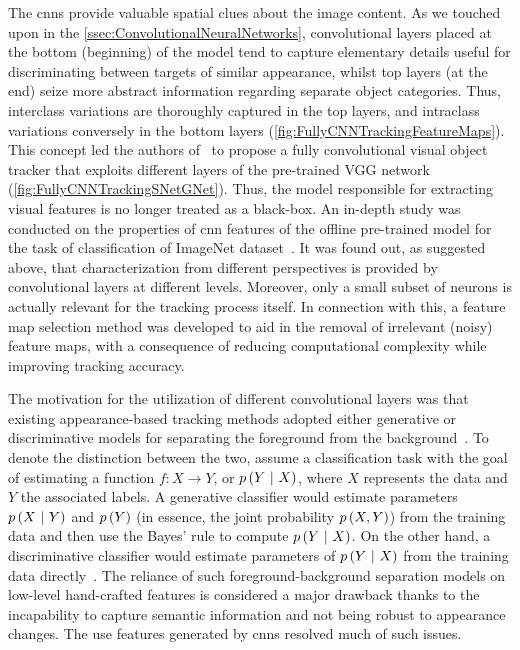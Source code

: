 The \glspl{cnn} provide valuable spatial clues about the image content. As we touched upon in the \cref{ssec:ConvolutionalNeuralNetworks}, convolutional layers placed at the bottom (beginning) of the model tend to capture elementary details useful for discriminating between targets of similar appearance, whilst top layers (at the end) seize more abstract information regarding separate object categories. Thus, interclass variations are thoroughly captured in the top layers, and intraclass variations conversely in the bottom layers (\cref{fig:FullyCNNTrackingFeatureMaps}). This concept led the authors of~\cite{Wang2015} to propose a fully convolutional visual object tracker that exploits different layers of the pre-trained VGG network~\cite{Simonyan2015} (\cref{fig:FullyCNNTrackingSNetGNet}). Thus, the model responsible for extracting visual features is no longer treated as a black-box. An in-depth study was conducted on the properties of \gls{cnn} features of the offline pre-trained model for the task of classification of ImageNet dataset~\cite{JiaDeng2009}. It was found out, as suggested above, that characterization from different perspectives is provided by convolutional layers at different levels. Moreover, only a small subset of neurons is actually relevant for the tracking process itself. In connection with this, a feature map selection method was developed to aid in the removal of irrelevant (noisy) feature maps, with a consequence of reducing computational complexity while improving tracking accuracy.

The motivation for the utilization of different convolutional layers was that existing appearance-based tracking methods adopted either generative or discriminative models for separating the foreground from the background~\cite{Wang2015}. To denote the distinction between the two, assume a classification task with the goal of estimating a function $f: X \to Y$, or $p \left( Y \ | \ X \right)$, where $X$ represents the data and $Y$ the associated labels. A generative classifier would estimate parameters $p \left( X \ | \ Y \right)$ and $p \left( Y \right)$ (in essence, the joint probability $p \left( X, Y \right)$) from the training data and then use the Bayes' rule to compute $p \left( Y \ | \ X \right)$. On the other hand, a discriminative classifier would estimate parameters of $p \left( Y \ | \ X \right)$ from the training data directly~\cite{ng2002discriminative}. The reliance of such foreground-background separation models on low-level hand-crafted features is considered a major drawback thanks to the incapability to capture semantic information and not being robust to appearance changes. The use features generated by \glspl{cnn} resolved much of such issues.

